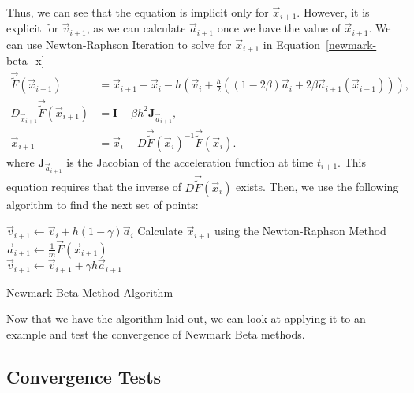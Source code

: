 \documentclass[../Main.tex]{subfiles}
\begin{document}
Thus, we can see that the equation is implicit only for $\vec{x}_{i+1}$. However, it is explicit for $\vec{v}_{i+1}$, as we can calculate $\vec{a}_{i+1}$ once we have the value of $\vec{x}_{i+1}$.  We can use Newton-Raphson Iteration to solve for $\vec{x}_{i+1}$ in Equation~\ref{newmark-beta_x}
\begin{align}
	\vec{\tilde{F}}\left(\vec{x}_{i+1}\right) & = \vec{x}_{i+1} - \vec{x}_{i} -h\left(\vec{v}_{i} + \frac{h}{2}\left(\left(1-2\beta\right)\vec{a}_{i} + 2\beta\vec{a}_{i+1}\left(\vec{x}_{i+1}\right)\right)\right), \nonumber \\
	D_{\vec{x}_{i+1}}\vec{\tilde{F}}\left(\vec{x}_{i+1}\right) & = \textbf{I} -  \beta h^{2}\textbf{J}_{\vec{a}_{i+1}},\nonumber \\
	\vec{x}_{i+1} & = \vec{x}_{i} - D\vec{\tilde{F}}\left(\vec{x}_{i}\right)^{-1}\vec{\tilde{F}}\left(\vec{x}_{i}\right). \label{eqn:newton-raphson_final_step}
\end{align}
where $\textbf{J}_{\vec{a}_{i+1}}$ is the Jacobian of the acceleration function at time $t_{i+1}$. This equation requires that the inverse of $D\vec{\tilde{F}}\left(\vec{x}_{i}\right)$ exists. Then, we use the following algorithm to find the next set of points: \\

\begin{algorithm}[H]
\SetAlgoLined
{}

\BlankLine

$\vec{v}_{i+1} \leftarrow \vec{v}_{i} + h\left(1-\gamma\right)\vec{a}_{i}$ 
Calculate $\vec{x}_{i+1}$ using the Newton-Raphson Method \\
$\vec{a}_{i+1} \leftarrow \frac{1}{m}\vec{F}\left(\vec{x}_{i+1}\right)$\\ 
$\vec{v}_{i+1} \leftarrow \vec{v}_{i+1} + \gamma h\vec{a}_{i+1}$ 
\caption{Newmark-Beta Method Algorithm}
\label{algorithm:newmark-beta}
\end{algorithm}
\BlankLine

Now that we have the algorithm laid out, we can look at applying it to an example and test the convergence of Newmark Beta methods.
\subsection{Convergence Tests}
\end{document}
